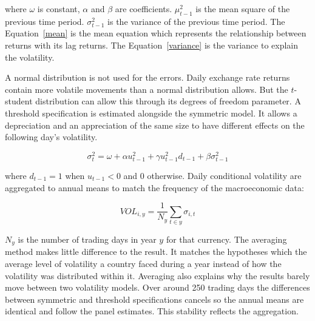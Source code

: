 where $\omega$ is constant, $\alpha$ and $\beta$ are coefficients. 
$\mu^2_{t-1}$ is the mean square of the previous time period.
$\sigma^2_{t-1}$ is the variance of the previous time period.
The Equation~\ref{mean} is the mean equation which represents the relationship between returns with its lag returns.
The Equation~\ref{variance} is the variance to explain the volatility.

\vspace{\baselineskip}

A normal distribution is not used for the errors.
Daily exchange rate returns contain more volatile movements than a normal distribution allows.
But the $t$-student distribution can allow this through its degrees of freedom parameter.
A threshold specification is estimated alongside the symmetric model.
It allows a depreciation and an appreciation of the same size to have different effects on the following day's volatility.

\vspace{\baselineskip}

\begin{equation}\label{asymmetric}
\sigma^2_t = \omega + \alpha u^2_{t-1} + \gamma u^2_{t-1} d_{t-1} + \beta \sigma^2_{t-1}
\end{equation}

\vspace{\baselineskip}

where $d_{t-1}=1$ when $u_{t-1}<0$ and $0$ otherwise.
Daily conditional volatility are aggregated to annual means to match the frequency of the macroeconomic data:

\vspace{\baselineskip}

\begin{equation}\label{annual_vol}
VOL_{i,y} = \frac{1}{N_y}\sum_{t\in y}\sigma_{i,t}
\end{equation}

\vspace{\baselineskip}
$N_y$ is the number of trading days in year $y$ for that currency.
The averaging method makes little difference to the result.
It matches the hypotheses which the average level of volatility a country faced during a year instead of how the volatility was distributed within it.
Averaging also explains why the results barely move between two volatility models.
Over around 250 trading days the differences between symmetric and threshold specifications cancels so the annual means are identical and follow the panel estimates.
This stability reflects the aggregation.

